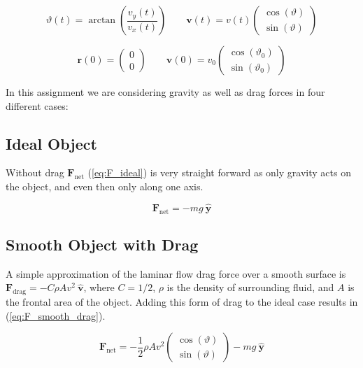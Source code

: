 \documentclass[notitlepage,aps,prd,nofootinbib]{revtex4-1}
\begin{document}
\begin{equation} \label{eq:vartheta}
\vartheta\left(t\right) = \arctan\left(\frac{v_{y}(t)}{v_{x}(t)}\right)
\qquad
\mathbf{v}\left(t\right) = v\left(t\right)
\begin{pmatrix}
  \cos(\vartheta) \\
  \sin(\vartheta)
\end{pmatrix}
\end{equation}

\begin{equation} \label{eq:initial_conditions}
\mathbf{r}\left(0\right) = 
\begin{pmatrix}
  0 \\
  0
\end{pmatrix}
\qquad
\mathbf{v}\left(0\right) = v_{0}
\begin{pmatrix}
  \cos(\vartheta_{0}) \\
  \sin(\vartheta_{0})
\end{pmatrix}
\end{equation}


In this assignment we are considering gravity as well as drag forces in four different cases:

\subsection{Ideal Object} \label{subsec:ideal}
Without drag $\mathbf{F}_{\text{net}}$ (\ref{eq:F_ideal}) is very straight forward as only gravity acts on the object, and even then only along one axis.

\begin{equation} \label{eq:F_ideal}
\mathbf{F}_{\text{net}} = -m g~\hat{\mathbf{y}}
\end{equation}

\subsection{Smooth Object with Drag} \label{subsec:smooth_drag}
A simple approximation of the laminar flow drag force over a smooth surface is $\mathbf{F}_{\text{drag}} = - C \rho A v^{2}~\hat{\mathbf{v}}$, where $C = 1/2$, $\rho$ is the density of surrounding fluid, and $A$ is the frontal area of the object. Adding this form of drag to the ideal case results in (\ref{eq:F_smooth_drag}).

\begin{equation} \label{eq:F_smooth_drag}
\mathbf{F}_{\text{net}} = - \frac{1}{2} \rho A v^{2} 
\begin{pmatrix}
  \cos(\vartheta) \\
  \sin(\vartheta)
\end{pmatrix}
-m g~\hat{\mathbf{y}}
\end{equation}
\end{document}
